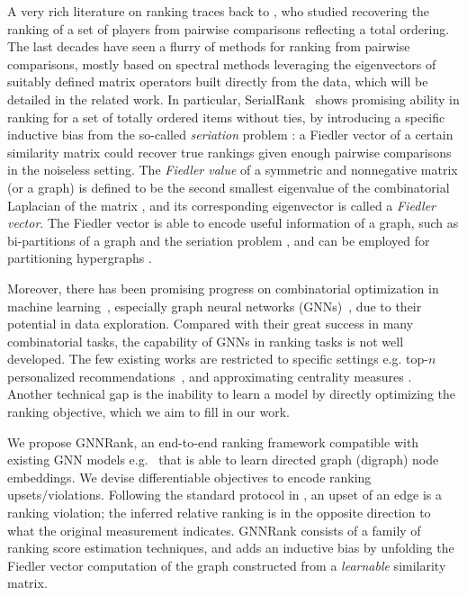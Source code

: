 \documentclass[nohyperref]{article}
\theoremstyle{plain}
\theoremstyle{definition}
\theoremstyle{remark}
\begin{document}
A very rich literature on ranking traces back to
\cite{KendallSmith1940}, who studied
recovering the ranking of a set of players from pairwise comparisons reflecting a total ordering. The last decades have seen a flurry of methods for ranking from pairwise comparisons, mostly based on spectral methods leveraging the eigenvectors of suitably defined matrix operators built directly from the data, which will be detailed in the related work. In particular, SerialRank~\cite{fogel2014SerialRank} shows promising ability in ranking for a set of totally ordered items without ties, by introducing a specific inductive bias from the so-called \emph{seriation} problem \cite{atkins1998spectral}: a Fiedler vector of a certain similarity matrix could recover true rankings given enough pairwise comparisons in the noiseless setting. The \emph{Fiedler value} of a symmetric and nonnegative 
matrix (or a graph) is defined to be the second smallest eigenvalue of the combinatorial Laplacian of the matrix
\cite{fiedler1973algebraic}, and its corresponding eigenvector is called a \emph{Fiedler vector}. 
The Fiedler vector is able to encode useful information of a graph, such as bi-partitions of a graph \cite{fiedler1973algebraic} and the seriation problem \cite{atkins1998spectral}, and can be employed for partitioning hypergraphs \cite{chen2017fiedler}.

Moreover, there has been promising progress on  combinatorial optimization 
in machine learning~\cite{WANG2021100010, maurya2021graph},
especially graph neural networks (GNNs)~\cite{Zhou, Wu},
due to their potential in data exploration.
Compared with their great success in many combinatorial tasks, the capability of GNNs 
in ranking tasks is 
not well 
developed. The few existing works are restricted 
to specific settings e.g. top-$n$ personalized recommendations~\cite{WANG2021100010}, and approximating centrality measures \cite{maurya2021graph}. Another technical gap is the inability to learn a model by directly optimizing the ranking objective, which we aim to fill in our work.

We propose GNNRank, an end-to-end ranking framework compatible with existing GNN models e.g.~\cite{he2021digrac, tong2020digraph} that is able to learn directed graph (digraph) node embeddings. We devise differentiable objectives to encode ranking upsets/violations. Following the standard protocol in \cite{d2021ranking}, an upset of an edge is a ranking violation; the inferred relative ranking is in the opposite direction to what the original measurement indicates. GNNRank consists of a family of ranking score estimation techniques, and adds an inductive bias by unfolding the Fiedler vector computation of the graph 
constructed from a \textit{learnable} similarity matrix.
\end{document}
